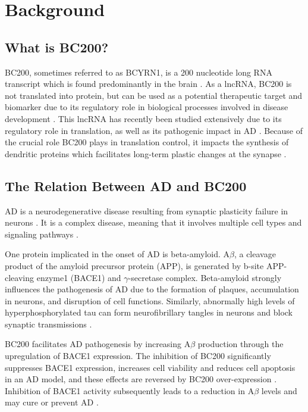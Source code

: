 \documentclass[conference, 11pt]{IEEEtran}
\begin{document}
\section{Background}\label{sec:background}

\subsection{What is BC200?}

BC200, sometimes referred to as BCYRN1, is a 200 nucleotide long RNA transcript which is found predominantly in the brain \cite{tiedge1993primary}. 
As a lncRNA, BC200 is not translated into protein, but can be used as a potential therapeutic target and biomarker due to its regulatory role in biological processes involved in disease development \cite{zhang2021role,mus2007dendritic}. 
This lncRNA has recently been studied extensively due to its regulatory role in translation, as well as its pathogenic impact in AD \cite{zhang2021role,tiedge1993primary}. 
Because of the crucial role BC200 plays in translation control, it impacts the synthesis of dendritic proteins which facilitates long-term plastic changes at the synapse \cite{mus2007dendritic}.

\subsection{The Relation Between AD and BC200}

AD is a neurodegenerative disease resulting from synaptic plasticity failure in neurons \cite{mus2007dendritic}. 
It is a complex disease, meaning that it involves multiple cell types and signaling pathways \cite{zhang2021role}. 

One protein implicated in the onset of AD is beta-amyloid. 
A$\beta$, a cleavage product of the amyloid precursor protein (APP), is generated by b-site APP-cleaving enzyme1 (BACE1) and $\gamma$-secretase complex. 
Beta-amyloid strongly influences the pathogenesis of AD due to the formation of plaques, accumulation in neurons, and disruption of cell functions. 
Similarly, abnormally high levels of hyperphosphorylated tau can form neurofibrillary tangles in neurons and block synaptic transmissions \cite{zhang2021role}. 

BC200 facilitates AD pathogenesis by increasing A$\beta$ production through the upregulation of BACE1 expression. 
The inhibition of BC200 significantly suppresses BACE1 expression, increases cell viability and reduces cell apoptosis in an AD model, and these effects are reversed by BC200 over-expression \cite{li2018identification,zhang2021role}. Inhibition of BACE1 activity subsequently leads to a reduction in A$\beta$ levels and may cure or prevent AD \cite{li2018identification,zhang2021role}.
\end{document}
